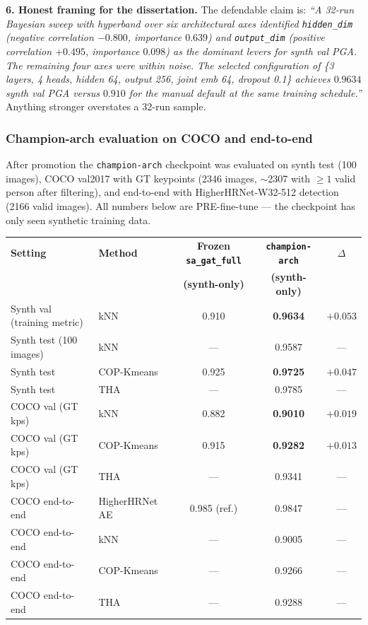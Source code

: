 \textbf{6. Honest framing for the dissertation.} The defendable claim is: \emph{``A 32-run Bayesian sweep with hyperband over six architectural axes identified \texttt{hidden\_dim} (negative correlation $-0.800$, importance $0.639$) and \texttt{output\_dim} (positive correlation $+0.495$, importance $0.098$) as the dominant levers for synth val PGA. The remaining four axes were within noise. The selected configuration of \{3 layers, 4 heads, hidden 64, output 256, joint emb 64, dropout 0.1\} achieves $0.9634$ synth val PGA versus $0.910$ for the manual default at the same training schedule.''} Anything stronger overstates a 32-run sample.

\subsubsection{Champion-arch evaluation on COCO and end-to-end}

After promotion the \texttt{champion-arch} checkpoint was evaluated on synth test (100 images), COCO val2017 with GT keypoints (2346 images, $\sim$2307 with $\geq 1$ valid person after filtering), and end-to-end with HigherHRNet-W32-512 detection (2166 valid images). All numbers below are PRE-fine-tune --- the checkpoint has only seen synthetic training data.

\begin{tabular}{llccc}
\hline
\textbf{Setting} & \textbf{Method} & \textbf{Frozen \texttt{sa\_gat\_full}} & \textbf{\texttt{champion-arch}} & \textbf{$\Delta$} \\
                 &                  & \textbf{(synth-only)}                 & \textbf{(synth-only)}            &                   \\
\hline
Synth val (training metric) & kNN          & 0.910  & \textbf{0.9634} & $+0.053$ \\
Synth test (100 images)     & kNN          & ---    & 0.9587          & ---      \\
Synth test                   & COP-Kmeans   & 0.925  & \textbf{0.9725} & $+0.047$ \\
Synth test                   & THA          & ---    & 0.9785          & ---      \\
\hline
COCO val (GT kps)            & kNN          & 0.882  & \textbf{0.9010} & $+0.019$ \\
COCO val (GT kps)            & COP-Kmeans   & 0.915  & \textbf{0.9282} & $+0.013$ \\
COCO val (GT kps)            & THA          & ---    & 0.9341          & ---      \\
\hline
COCO end-to-end              & HigherHRNet AE & 0.985 (ref.) & 0.9847 & ---      \\
COCO end-to-end              & kNN          & ---    & 0.9005          & ---      \\
COCO end-to-end              & COP-Kmeans   & ---    & 0.9266          & ---      \\
COCO end-to-end              & THA          & ---    & 0.9288          & ---      \\
\hline
\end{tabular}

